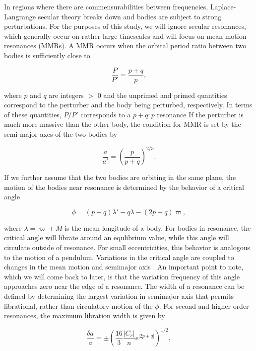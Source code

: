 \documentclass[twocolumn]{aastex63}
\begin{document}
In regions where there are commensurabilities between frequencies, Laplace-Langrange secular theory breaks down and bodies are subject to strong 
perturbations. For the purposes of this study, we will ignore secular resonances, which generally occur on rather large timescales and will focus on 
mean motion resonances (MMRs). A MMR occurs  when the orbital period ratio between two bodies is sufficiently close to

\begin{equation}\label{eq:per_mmr}
	\frac{P}{P'} = \frac{p + q}{p},
\end{equation}

\noindent where  $p$ and $q$ are integers $>$ 0 and the unprimed and primed quantities correspond to the perturber and the body being perturbed, respectively. In terms of these quantities, $P/P'$ corresponds to a $p+q:p$ resonance If the perturber is much more massive than the other body, the condition for MMR is set  by the semi-major axes of the two bodies by

\begin{equation}\label{eq:a_mmr}
	\frac{a}{a'} = \left( \frac{p}{p + q} \right)^{2/3}.
\end{equation}

If we further assume that the two bodies are orbiting in the same plane, the motion of the bodies near resonance is determined by the
behavior of a critical angle

\begin{equation}\label{eq:phi_crit}
	\phi = (p + q) \lambda' - q \lambda - (2 p + q) \varpi,
\end{equation}

\noindent where $\lambda = \varpi + M$ is the mean longitude of a body. For bodies in resonance, the critical angle will librate around an 
equlibrium value, while this angle will circulate outside of resonance. For small eccentricities, this behavior is analogous to the motion of a 
pendulum. Variations in the critical angle are coupled to changes in the mean motion and semimajor axis \citep{2000ssd..book.....M}. An important 
point to note, which we will come back to later, is that the variation frequency of this angle approaches zero near the edge of a resonance. The 
width of a resonance can be defined by determining the largest variation in semimajor axis that permits librational, rather than circulatory motion of 
the $\phi$. For second and higher order resonances, the maximum libration width is given by

\begin{equation}\label{eq:res_so}
	\frac{\delta a}{a} = \pm \left( \frac{16}{3} \frac{\left| C_{r} \right|}{n} e^{\left| 2 p + q \right|} \right)^{1/2},
\end{equation}
\end{document}
